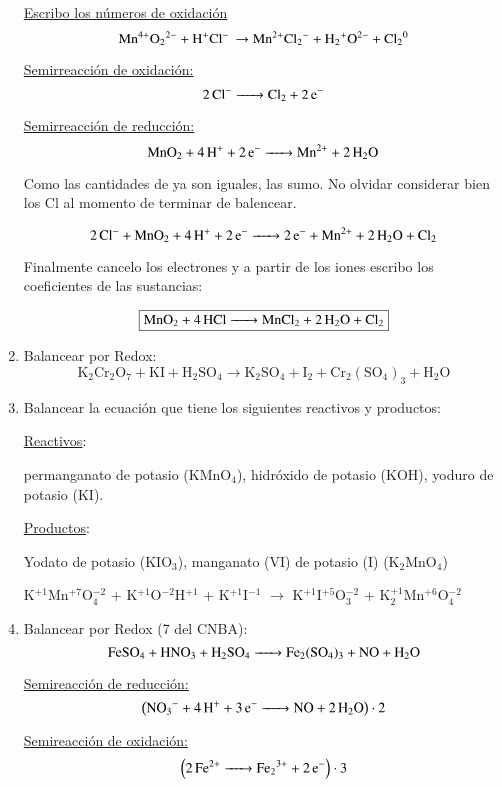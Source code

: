\begin{enumerate}
\underline{Escribo los números de oxidación}
$$\ce{Mn^{4+}O_2^{2-} + H^{+}Cl^{-} \rightarrow Mn^{2+}Cl_2^{-} + H_2^+O^{2-} + Cl_2^{0}}$$

\begin{multicols}{2}
    \underline{Semirreacción de oxidación:}
    $$\ce{2Cl^- ->
    Cl_2 + 2e^-}$$
    
    \underline{Semirreacción de reducción:}
    $$\ce{MnO_2 + 4 H^+ + 2e^- ->
    Mn^{2+} + 2H_2O}$$
\end{multicols}

Como las cantidades de  ya son iguales, las sumo. No olvidar considerar bien los Cl al momento de terminar de balencear.

$$\ce{2 Cl^- + MnO_2 + 4H^+ + 2e^- -> 2e^- + Mn^{2+} + 2H_2O + Cl_2}$$

Finalmente cancelo los electrones y a partir de los iones escribo los coeficientes de las sustancias:

$$\fbox{\ce{MnO_2 + 4HCl -> MnCl_2 + 2H_2O + Cl_2}}$$


\item Balancear por Redox:
$$\text{K}_2\text{Cr}_2\text{O}_7 + \text{KI} + \text{H}_2\text{SO}_4 \longrightarrow \text{K}_2\text{SO}_4 + \text{I}_2 + \text{Cr}_2(\text{SO}_4)_3 + \text{H}_2\text{O}$$


\item Balancear la ecuación que tiene los siguientes reactivos y productos:

\underline{Reactivos}:

permanganato de potasio (KMnO$_4$), hidróxido de potasio (KOH), yoduro de potasio (KI).

\skipline
\underline{Productos}:

Yodato de potasio (KIO$_3$), manganato (VI) de potasio (I) (K$_2$MnO$_4$)

\skipline
{\large
\hfil
K$^{+1}$Mn$^{+7}$O$_4^{-2}$ \hfil+\hfil
K$^{+1}$O$^{-2}$H$^{+1}$ \hfil+\hfil
K$^{+1}$I$^{-1}$ \hfil$\longrightarrow$\hfil
K$^{+1}$I$^{+5}$O$_3^{-2}$ \hfil+\hfil
K$_2^{+1}$Mn$^{+6}$O$_4^{-2}$
\hfil
}


\item Balancear por Redox (7 del CNBA):
$$\ce{FeSO_4 + HNO_3 + H_2SO_4 -> Fe_2(SO4)3 + NO + H2O}$$

\begin{multicols}{2}
\underline{Semireacción de reducción:}
 $$\left(\ce{NO_3^- + 4H^+ + 3e^- -> NO + 2H_2O}\right)\cdot 2$$

\underline{Semireacción de oxidación:}
$$\left(\ce{ 2Fe^{2+} -> Fe_2^{3+} + 2e^-}  \right)\cdot 3$$
\end{multicols}


\end{enumerate}
